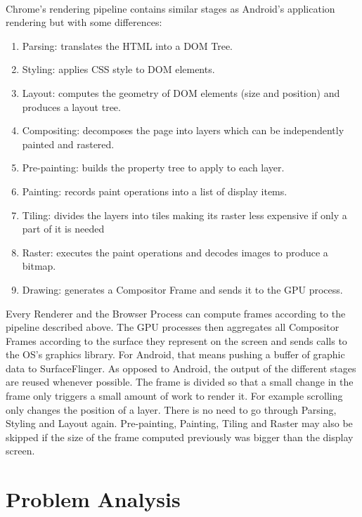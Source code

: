 \documentclass{kththesis}
\begin{document}
\paragraph{}
Chrome's rendering pipeline \cite{chrome_pixel} contains similar stages as Android's application rendering but with some differences: 
\begin{enumerate}
    \item Parsing: translates the HTML into a DOM Tree.
    \item Styling: applies CSS style to DOM elements.
    \item Layout: computes the geometry of DOM elements (size and position) and produces a layout tree.
    \item Compositing: decomposes the page into layers which can be independently painted and rastered.
    \item Pre-painting: builds the property tree to apply to each layer.
    \item Painting: records paint operations into a list of display items.
    \item Tiling: divides the layers into tiles making its raster less expensive if only a part of it is needed
    \item Raster: executes the paint operations and decodes images to produce a bitmap.
    \item Drawing: generates a Compositor Frame and sends it to the GPU process.
\end{enumerate}
Every Renderer and the Browser Process can compute frames according to the pipeline described above. The GPU processes then aggregates all Compositor Frames according to the surface they represent on the screen and sends calls to the OS's graphics library. For Android, that means pushing a buffer of graphic data to SurfaceFlinger.
\newline
As opposed to Android, the output of the different stages are reused whenever possible. The frame is divided so that a small change in the frame only triggers a small amount of work to render it. 
For example scrolling only changes the position of a layer. There is no need to go through Parsing, Styling and Layout again. Pre-painting, Painting, Tiling and Raster may also be skipped if the size of the frame computed previously was bigger than the display screen.  

\section{Problem Analysis}
\end{document}
